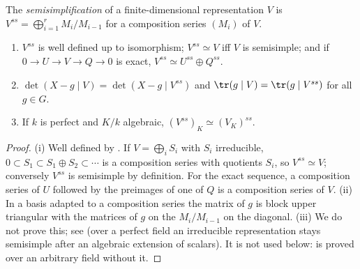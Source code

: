 \begin{definition}\label{def:reps:semisimplification}
The \emph{semisimplification} of a finite-dimensional representation $V$ is $V^{ss}=\bigoplus_{i=1}^rM_i/M_{i-1}$ for a composition series
$(M_i)$ of $V$.
\end{definition}

\begin{proposition}\label{prop:reps:semisimplification}
\begin{enumerate}[label=(\roman*)]
\item $V^{ss}$ is well defined up to isomorphism; $V^{ss}\simeq V$ iff $V$ is semisimple; and if $0\to U\to V\to Q\to0$ is exact, $V^{ss}\simeq U^{ss}\oplus Q^{ss}$.
\item $\det(X-g\mid V)=\det(X-g\mid V^{ss})$ and $\tr(g\mid V)=\tr(g\mid V^{ss})$ for all $g\in G$.
\item If $k$ is perfect and $K/k$ algebraic, $(V^{ss})_K\simeq(V_K)^{ss}$.
\end{enumerate}
\end{proposition}

\begin{proof}
(i) Well defined by . If $V=\bigoplus_iS_i$ with $S_i$ irreducible, $0\subset S_1\subset S_1\oplus S_2\subset\cdots$ is a
composition series with quotients $S_i$, so $V^{ss}\simeq V$; conversely $V^{ss}$ is semisimple by definition. For the exact sequence, a
composition series of $U$ followed by the preimages of one of $Q$ is a composition series of $V$.
(ii) In a basis adapted to a composition series the matrix of $g$ is block upper triangular with the matrices of $g$ on the
$M_i/M_{i-1}$ on the diagonal.
(iii) We do not prove this; see \cite[Section 29]{CurtisReiner} (over a perfect field an irreducible representation stays semisimple
after an algebraic extension of scalars). It is not used below:  is proved over an arbitrary field
without it.
\end{proof}

